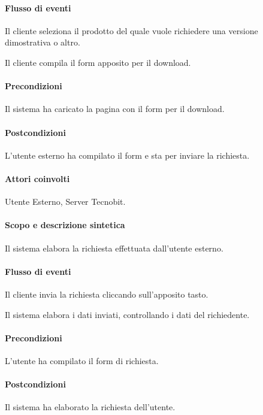 \paragraph{Flusso di eventi}
\begin{elenconumerato}[\textbf{}]{\subsubsecindent}
\item Il cliente seleziona il prodotto del quale vuole richiedere una versione dimostrativa o altro.
\item Il cliente compila il form apposito per il download.
\end{elenconumerato}
\paragraph{Precondizioni} Il sistema ha caricato la pagina con il form per il download.
\paragraph{Postcondizioni} L'utente esterno ha compilato il form e sta per inviare la richiesta.

\paragraph{Attori coinvolti} Utente Esterno, Server Tecnobit.
\paragraph{Scopo e descrizione sintetica}
Il sistema elabora la richiesta effettuata dall'utente esterno.
\paragraph{Flusso di eventi}
\begin{elenconumerato}[\textbf{}]{\subsubsecindent}
\item Il cliente invia la richiesta cliccando sull'apposito tasto.
\item Il sistema elabora i dati inviati, controllando i dati del richiedente.
\end{elenconumerato}
\paragraph{Precondizioni} L'utente ha compilato il form di richiesta.
\paragraph{Postcondizioni} Il sistema ha elaborato la richiesta dell'utente.

